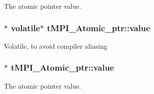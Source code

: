 \-The atomic pointer value. \hypertarget{structtMPI__Atomic__ptr_a1fe92a78f8748e8fed32f668a5101541}{
\subsubsection[{value}]{$\ast$ volatile$\ast$ {\bf t\-M\-P\-I\-\_\-\-Atomic\-\_\-ptr\-::value}}}\label{structtMPI__Atomic__ptr_a1fe92a78f8748e8fed32f668a5101541}
\-Volatile, to avoid compiler aliasing \hypertarget{structtMPI__Atomic__ptr_a96a224af4958cc4ca57b99c75575c299}{
\subsubsection[{value}]{$\ast$ {\bf t\-M\-P\-I\-\_\-\-Atomic\-\_\-ptr\-::value}}}\label{structtMPI__Atomic__ptr_a96a224af4958cc4ca57b99c75575c299}
\-The atomic pointer value. 

